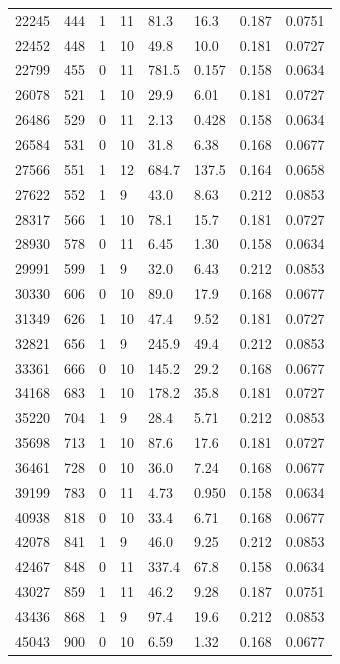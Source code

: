 \documentclass[preview]{standalone}
\begin{document}
{{\begin{tabular}{L{1.2cm}C{1.2cm} C{0.3cm}C{0.5cm} C{1.4cm}C{1.4cm} C{1.4cm}C{1.4cm}}
  22245  &   444  & 1     & 11 &  81.3  & 16.3  & 0.187 &  0.0751   \\ 
  22452  &   448  & 1     & 10 &  49.8  & 10.0  & 0.181 &  0.0727   \\ 
  22799  &   455  & 0     & 11 &  781.5  & 0.157  & 0.158 &  0.0634   \\ 
  26078  &   521  & 1     & 10 &  29.9  & 6.01  & 0.181 &  0.0727   \\ 
  26486  &   529  & 0     & 11 &  2.13  & 0.428  & 0.158 &  0.0634   \\ 
  26584  &   531  & 0     & 10 &  31.8  & 6.38  & 0.168 &  0.0677   \\ 
  27566  &   551  & 1     & 12 &  684.7  & 137.5  & 0.164 &  0.0658   \\ 
  27622  &   552  & 1     &  9 &  43.0  & 8.63  & 0.212 &  0.0853   \\ 
  28317  &   566  & 1     & 10 &  78.1  & 15.7  & 0.181 &  0.0727   \\ 
  28930  &   578  & 0     & 11 &  6.45  & 1.30  & 0.158 &  0.0634   \\ 
  29991  &   599  & 1     &  9 &  32.0  & 6.43  & 0.212 &  0.0853   \\ 
  30330  &   606  & 0     & 10 &  89.0  & 17.9  & 0.168 &  0.0677   \\ 
  31349  &   626  & 1     & 10 &  47.4  & 9.52  & 0.181 &  0.0727   \\ 
  32821  &   656  & 1     &  9 &  245.9  & 49.4  & 0.212 &  0.0853   \\ 
  33361  &   666  & 0     & 10 &  145.2  & 29.2  & 0.168 &  0.0677   \\ 
  34168  &   683  & 1     & 10 &  178.2  & 35.8  & 0.181 &  0.0727   \\ 
  35220  &   704  & 1     &  9 &  28.4  & 5.71  & 0.212 &  0.0853   \\ 
  35698  &   713  & 1     & 10 &  87.6  & 17.6  & 0.181 &  0.0727   \\ 
  36461  &   728  & 0     & 10 &  36.0  & 7.24  & 0.168 &  0.0677   \\ 
  39199  &   783  & 0     & 11 &  4.73  & 0.950  & 0.158 &  0.0634   \\ 
  40938  &   818  & 0     & 10 &  33.4  & 6.71  & 0.168 &  0.0677   \\ 
  42078  &   841  & 1     &  9 &  46.0  & 9.25  & 0.212 &  0.0853   \\ 
  42467  &   848  & 0     & 11 &  337.4  & 67.8  & 0.158 &  0.0634   \\ 
  43027  &   859  & 1     & 11 &  46.2  & 9.28  & 0.187 &  0.0751   \\ 
  43436  &   868  & 1     &  9 &  97.4  & 19.6  & 0.212 &  0.0853   \\ 
  45043  &   900  & 0     & 10 &  6.59  & 1.32  & 0.168 &  0.0677   \\ 
\hline 
\end{tabular} 

}}
\end{document}
